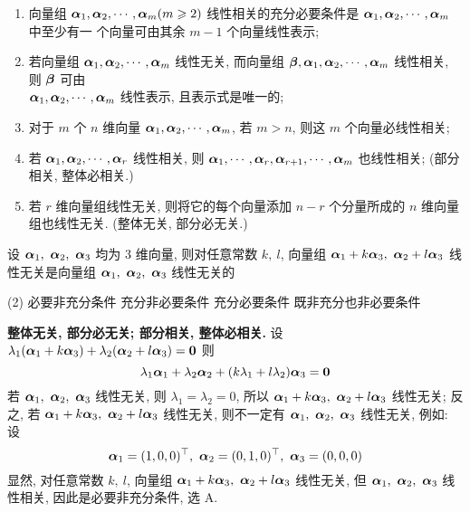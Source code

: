 \begin{theorem}[向量组线性相关的若干结论]
    \begin{enumerate}[label=(\arabic{*})]
        \item 向量组 $ \vb*{\alpha}_{1}, \vb*{\alpha}_{2}, \cdots, \vb*{\alpha}_{m}(m \geqslant 2) $ 线性相关的充分必要条件是 $ \vb*{\alpha}_{1}, \vb*{\alpha}_{2}, \cdots, \vb*{\alpha}_{m} $ 中至少有一 个向量可由其余 $ m-1 $ 个向量线性表示;
        \item 若向量组 $ \vb*{\alpha}_{1}, \vb*{\alpha}_{2}, \cdots, \vb*{\alpha}_{m} $ 线性无关, 而向量组 $ \vb*{\beta}, \vb*{\alpha}_{1}, \vb*{\alpha}_{2}, \cdots, \vb*{\alpha}_{m} $ 线性相关, 则 $ \vb*{\beta} $ 可由 \\$ \vb*{\alpha}_{1}, \vb*{\alpha}_{2}, \cdots, \vb*{\alpha}_{m} $ 线性表示, 且表示式是唯一的;
        \item 对于 $ m $ 个 $ n $ 维向量 $ \vb*{\alpha}_{1}, \vb*{\alpha}_{2}, \cdots, \vb*{\alpha}_{m}$,  若 $ m>n $, 则这 $ m $ 个向量必线性相关;
        \item 若 $ \vb*{\alpha}_{1}, \vb*{\alpha}_{2}, \cdots, \vb*{\alpha}_{r} $ 线性相关, 则 $ \vb*{\alpha}_{1}, \cdots, \vb*{\alpha}_{r}, \vb*{\alpha}_{r+1}, \cdots, \vb*{\alpha}_{m} $ 也线性相关; (部分相关, 整体必相关.)
        \item 若 $ r $ 维向量组线性无关, 则将它的每个向量添加 $ n-r $ 个分量所成的 $ n $ 维向量组也线性无关. (整体无关, 部分必无关.)
    \end{enumerate}
\end{theorem}

\begin{example}[2014 数一]
    设 $\vb*{\alpha}_1,~\vb*{\alpha}_2,~\vb*{\alpha}_3$ 均为 3 维向量, 则对任意常数 $k,~l$, 向量组 $\vb*{\alpha}_1+k\vb*{\alpha}_3,~\vb*{\alpha}_2+l\vb*{\alpha}_3$ 线性无关是向量组 $\vb*{\alpha}_1,~\vb*{\alpha}_2,~\vb*{\alpha}_3$ 线性无关的
    \begin{tasks}(2)
        \task 必要非充分条件
        \task 充分非必要条件
        \task 充分必要条件
        \task 既非充分也非必要条件
    \end{tasks}
\end{example}
\begin{solution}
    \textbf{整体无关, 部分必无关; 部分相关, 整体必相关. }
    设 $\lambda_1(\vb*{\alpha}_1+k\vb*{\alpha}_3)+\lambda_2(\vb*{\alpha}_2+l\vb*{\alpha}_3)=\vb*{0}$ 则 $$\lambda_1\vb*{\alpha}_1+\lambda_2\vb*{\alpha}_2+(k\lambda_1+l\lambda_2)\vb*{\alpha}_3=\vb*{0}$$
    若 $\vb*{\alpha}_1,~\vb*{\alpha}_2,~\vb*{\alpha}_3$ 线性无关, 则 $\lambda_1=\lambda_2=0$, 所以 $\vb*{\alpha}_1+k\vb*{\alpha}_3,~\vb*{\alpha}_2+l\vb*{\alpha}_3$ 线性无关;
    反之, 若 $\vb*{\alpha}_1+k\vb*{\alpha}_3,~\vb*{\alpha}_2+l\vb*{\alpha}_3$ 线性无关, 则不一定有 $\vb*{\alpha}_1,~\vb*{\alpha}_2,~\vb*{\alpha}_3$ 线性无关, 例如: 设
    $$\vb*{\alpha}_1=(1,0,0)^\top,~\vb*{\alpha}_2=(0,1,0)^\top,~\vb*{\alpha}_3=(0,0,0)$$
    显然, 对任意常数 $k,~l$, 向量组 $\vb*{\alpha}_1+k\vb*{\alpha}_3,~\vb*{\alpha}_2+l\vb*{\alpha}_3$ 线性无关, 但 $\vb*{\alpha}_1,~\vb*{\alpha}_2,~\vb*{\alpha}_3$ 线性相关, 因此是必要非充分条件, 选 A.
\end{solution}

